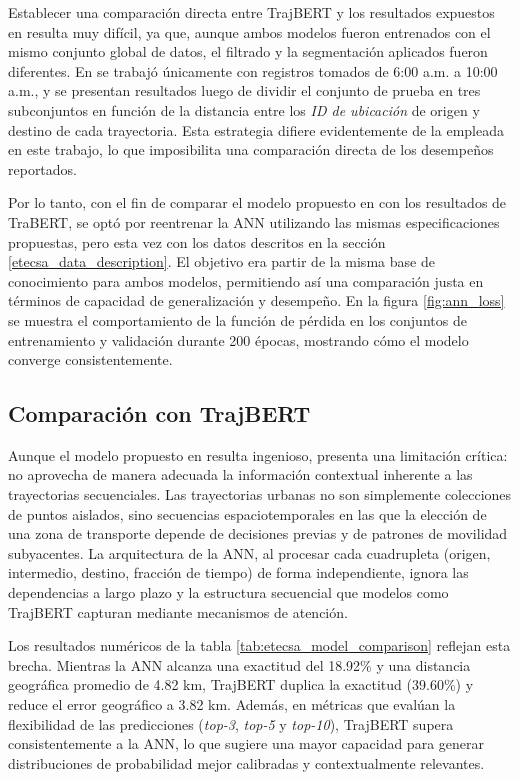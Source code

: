 Establecer una comparación directa entre TrajBERT y los resultados expuestos en \cite{rodriguez2022movilidad} resulta muy difícil, ya que, aunque ambos modelos fueron entrenados con el mismo conjunto global de datos, el filtrado y la segmentación aplicados fueron diferentes. En \cite{rodriguez2022movilidad} se trabajó únicamente con registros tomados de 6:00 a.m. a 10:00 a.m., y se presentan resultados luego de dividir el conjunto de prueba en tres subconjuntos en función de la distancia entre los \textit{ID de ubicación} de origen y destino de cada trayectoria. Esta estrategia difiere evidentemente de la empleada en este trabajo, lo que imposibilita una comparación directa de los desempeños reportados.

Por lo tanto, con el fin de comparar el modelo propuesto en \cite{rodriguez2022movilidad} con los resultados de TraBERT, se optó por reentrenar la ANN utilizando las mismas especificaciones propuestas, pero esta vez con los datos descritos en la sección \ref{etecsa_data_description}. El objetivo era partir de la misma base de conocimiento para ambos modelos, permitiendo así una comparación justa en términos de capacidad de generalización y desempeño. En la figura \ref{fig:ann_loss} se muestra el comportamiento de la función de pérdida en los conjuntos de entrenamiento y validación durante 200 épocas, mostrando cómo el modelo converge consistentemente.

\subsection{Comparación con TrajBERT}

Aunque el modelo propuesto en \cite{rodriguez2022movilidad} resulta ingenioso, presenta una limitación crítica: no aprovecha de manera adecuada la información contextual inherente a las trayectorias secuenciales. Las trayectorias urbanas no son simplemente colecciones de puntos aislados, sino secuencias espaciotemporales en las que la elección de una zona de transporte depende de decisiones previas y de patrones de movilidad subyacentes. La arquitectura de la ANN, al procesar cada cuadrupleta (origen, intermedio, destino, fracción de tiempo) de forma independiente, ignora las dependencias a largo plazo y la estructura secuencial que modelos como TrajBERT capturan mediante mecanismos de atención.

Los resultados numéricos de la tabla \ref{tab:etecsa_model_comparison} reflejan esta brecha. Mientras la ANN alcanza una exactitud del 18.92\% y una distancia geográfica promedio de 4.82 km, TrajBERT duplica la exactitud (39.60\%) y reduce el error geográfico a 3.82 km. Además, en métricas que evalúan la flexibilidad de las predicciones (\textit{top-3}, \textit{top-5} y \textit{top-10}), TrajBERT supera consistentemente a la ANN, lo que sugiere una mayor capacidad para generar distribuciones de probabilidad mejor calibradas y contextualmente relevantes.

